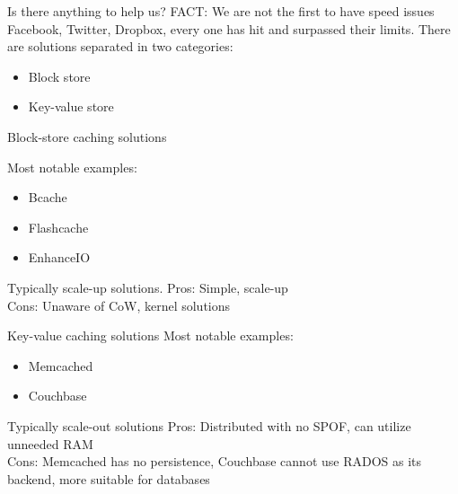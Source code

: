 \begin{frame}
	Is there anything to help us?
	\dspc
	FACT: We are not the first to have speed issues\\
	Facebook, Twitter, Dropbox, every one has hit and surpassed their limits.
	\dspc
	There are solutions separated in two categories:
	\begin{itemize}
		\item Block store
		\item Key-value store
	\end{itemize}
\end{frame}

\begin{frame}{Block-store caching solutions}

	Most notable examples:
	\begin{itemize}
		\item Bcache
		\item Flashcache
		\item EnhanceIO
	\end{itemize}
	\dspc
	Typically scale-up solutions.
	\dspc
	Pros: Simple, scale-up\\
	Cons: Unaware of CoW, kernel solutions


\end{frame}

\begin{frame}{Key-value caching solutions}
	Most notable examples:
	\begin{itemize}
		\item Memcached
		\item Couchbase
	\end{itemize}
	\dspc
	Typically scale-out solutions
	\dspc
	Pros: Distributed with no SPOF, can utilize unneeded RAM\\
	Cons: Memcached has no persistence, Couchbase cannot use RADOS as its 
	backend, more suitable for databases
\end{frame}

